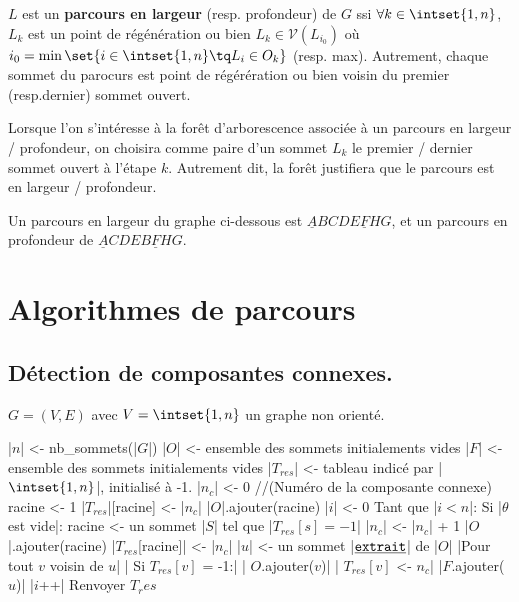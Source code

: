 \documentclass{scrartcl}
\begin{document}
			$L$ est un \textbf{parcours en largeur} (resp. profondeur) de $G$ ssi
			$\forall k \in \intset{1,n}$, $L_k$ est un point de régénération 
			ou bien $L_k \in \mathscr{V}(L_{i_0})$ où $i_0 = \min\set{i\in\intset{1,n} \tq L_i \in O_k}$ (resp. max).	
			Autrement, chaque sommet du parocurs est point de régérération ou bien voisin du premier (resp.dernier) sommet ouvert.

			\rem Lorsque l'on s'intéresse à la forêt d'arborescence associée à un parcours en largeur / profondeur, 
			on choisira comme paire d'un sommet $L_k$ le premier / dernier sommet ouvert à l'étape $k$.
			Autrement dit, la forêt justifiera que le parcours est en largeur / profondeur.

			\exemple Un parcours en largeur du graphe ci-dessous est $\underline{A}BCDE\underline{F}HG$, 
			et un parcours en profondeur de $\underline{A}CDEB\underline{F}HG$.
			\begin{center}  \end{center}

	\section{Algorithmes de parcours}
		\subsection{Détection de composantes connexes.}
			$G = (V,E)$ avec $V = \intset{1,n}$ un graphe non orienté.
			\begin{algotext}
				|$n$| <- nb_sommets(|$G$|)
				|$O$| <- ensemble des sommets initialements vides
				|$F$| <- ensemble des sommets initialements vides
				|$T_{res}$| <- tableau indicé par |$\intset{1,n}$|, initialisé à -1.
				|$n_c$| <- 0  //(Numéro de la composante connexe)
				racine <- 1
				|$T_{res}$|[racine] <- |$n_c$|
				|$O$|.ajouter(racine)
				|$i$| <- 0
				Tant que |$i < n$|:
					Si |$\theta$ est vide|:
						racine <- un sommet |$S$| tel que |$T_{res}[s] = -1$|
						|$n_c$| <- |$n_c$| + 1
						|$O$|.ajouter(racine)
						|$T_{res}$[racine]| <- |$n_c$|
					|$u$| <- un sommet |$\texttt{\underline{extrait}}$| de |$O$|
					|Pour tout $v$ voisin de $u$|
					|	Si $T_{res}[v]$ = -1:|
					|		$O$.ajouter($v$)|
					|		$T_{res}[v]$ <- $n_c$|
					|$F$.ajouter($u$)|
					|$i$++|
				Renvoyer $T_res$
			\end{algotext}
\end{document}
